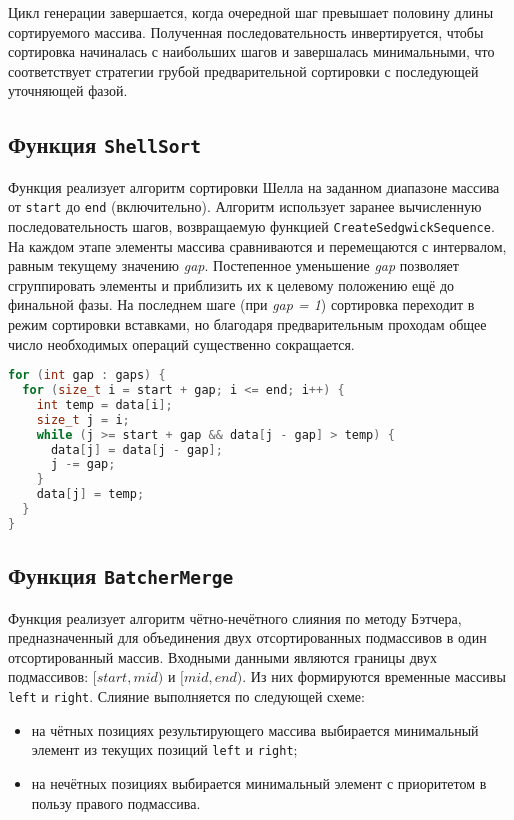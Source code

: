 \documentclass[a4paper,12pt]{article}
\begin{document}
Цикл генерации завершается, когда очередной шаг превышает половину длины сортируемого массива. Полученная последовательность инвертируется, чтобы сортировка начиналась с наибольших шагов и завершалась минимальными, что соответствует стратегии грубой предварительной сортировки с последующей уточняющей фазой.

\vspace{1em}
\subsection{Функция \texttt{ShellSort}}
Функция реализует алгоритм сортировки Шелла на заданном диапазоне массива от \texttt{start} до \texttt{end} (включительно). Алгоритм использует заранее вычисленную последовательность шагов, возвращаемую функцией \texttt{CreateSedgwickSequence}. На каждом этапе элементы массива сравниваются и перемещаются с интервалом, равным текущему значению \textit{gap}. Постепенное уменьшение \textit{gap} позволяет сгруппировать элементы и приблизить их к целевому положению ещё до финальной фазы.
На последнем шаге (при \textit{gap = 1}) сортировка переходит в режим сортировки вставками, но благодаря предварительным проходам общее число необходимых операций существенно сокращается.

\vspace{0.5em}
\begin{lstlisting}[language=C++,caption={Основной цикл сортировки ShellSort}]
for (int gap : gaps) {
  for (size_t i = start + gap; i <= end; i++) {
    int temp = data[i];
    size_t j = i;
    while (j >= start + gap && data[j - gap] > temp) {
      data[j] = data[j - gap];
      j -= gap;
    }
    data[j] = temp;
  }
}
\end{lstlisting}

\vspace{0.5em}
\vspace{1em}
\subsection{Функция \texttt{BatcherMerge}}
Функция реализует алгоритм чётно-нечётного слияния по методу Бэтчера, предназначенный для объединения двух отсортированных подмассивов в один отсортированный массив. Входными данными являются границы двух подмассивов: $[start, mid)$ и $[mid, end)$. Из них формируются временные массивы \texttt{left} и \texttt{right}.
Слияние выполняется по следующей схеме:

\begin{itemize}
    \item на чётных позициях результирующего массива выбирается минимальный элемент из текущих позиций \texttt{left} и \texttt{right};
    \item на нечётных позициях выбирается минимальный элемент с приоритетом в пользу правого подмассива.
\end{itemize}
\end{document}
